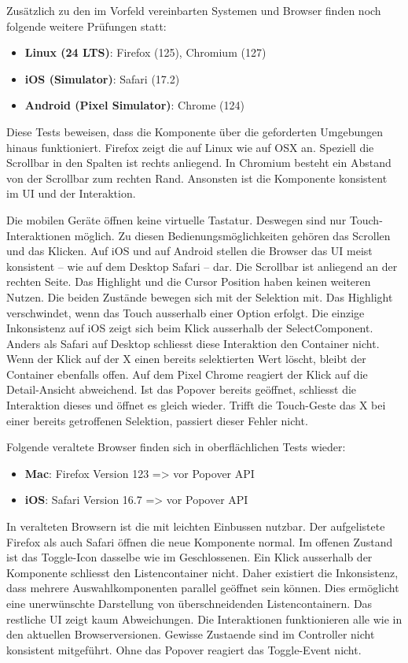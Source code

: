 Zusätzlich zu den im Vorfeld vereinbarten Systemen und Browser finden noch folgende weitere Prüfungen statt: 

\begin{itemize}
    \item \textbf{Linux (24 LTS)}: Firefox (125), Chromium (127)
    \item \textbf{iOS (Simulator)}: Safari (17.2)
    \item \textbf{Android (Pixel Simulator)}: Chrome (124)
\end{itemize}

Diese Tests beweisen, dass die Komponente über die geforderten Umgebungen hinaus funktioniert. 
Firefox zeigt die  auf Linux wie auf OSX an. 
Speziell die Scrollbar in den Spalten ist rechts anliegend. 
In Chromium besteht ein Abstand von der Scrollbar zum rechten Rand. 
Ansonsten ist die Komponente konsistent im UI und der Interaktion. 

Die mobilen Geräte öffnen keine virtuelle Tastatur. 
Deswegen sind nur Touch-Inter\-aktionen möglich. 
Zu diesen Bedienungsmöglichkeiten gehören das Scrollen und das Klicken. 
Auf iOS und auf Android stellen die Browser das UI meist konsistent – wie auf dem Desktop Safari – dar. 
Die Scrollbar ist anliegend an der rechten Seite. 
Das Highlight und die Cursor Position haben keinen weiteren Nutzen. 
Die beiden Zustände bewegen sich mit der Selektion mit. 
Das Highlight verschwindet, wenn das Touch ausserhalb einer Option erfolgt. 
Die einzige Inkonsistenz auf iOS zeigt sich beim Klick ausserhalb der SelectComponent. 
Anders als Safari auf Desktop schliesst diese Interaktion den Container nicht. 
Wenn der Klick auf der X einen bereits selektierten Wert löscht, bleibt der Container ebenfalls offen. 
Auf dem Pixel Chrome reagiert der Klick auf die Detail-Ansicht abweichend. 
Ist das Popover bereits geöffnet, schliesst die Interaktion dieses und öffnet es gleich wieder. 
Trifft die Touch-Geste das X bei einer bereits getroffenen Selektion, passiert dieser Fehler nicht.  

Folgende veraltete Browser finden sich in oberflächlichen Tests wieder: 

\begin{itemize}
    \item \textbf{Mac}: Firefox Version 123 => vor Popover API
    \item \textbf{iOS}: Safari Version 16.7 => vor Popover API
\end{itemize}

In veralteten Browsern ist die  mit leichten Einbussen nutzbar. 
Der aufgelistete Firefox als auch Safari öffnen die neue Komponente normal. 
Im offenen Zustand ist das Toggle-Icon dasselbe wie im Geschlossenen. 
Ein Klick ausserhalb der Komponente schliesst den Listencontainer nicht. 
Daher existiert die Inkonsistenz, dass mehrere Auswahlkomponenten parallel geöffnet sein können. 
Dies ermöglicht eine unerwünschte Darstellung von überschneidenden Listencontainern. 
Das restliche UI zeigt kaum Abweichungen. 
Die Interaktionen funktionieren alle wie in den aktuellen Browserversionen. 
Gewisse Zustaende sind im Controller nicht konsistent mitgeführt. 
Ohne das Popover reagiert das Toggle-Event nicht.

